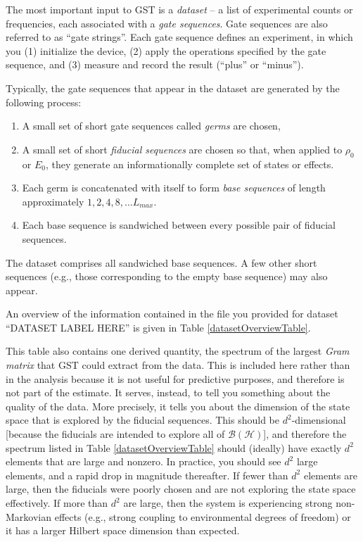 \documentclass{article}[11pt]
\newcommand{\putfield}[2]{#2}
\begin{document}
The most important input to GST is a \emph{dataset} -- a list of experimental counts or frequencies, each associated with a \emph{gate sequences}.  Gate sequences are also referred to as ``gate strings''.  Each gate sequence defines an experiment, in which you (1) initialize the device, (2) apply the operations specified by the gate sequence, and (3) measure and record the result (``plus'' or ``minus'').

Typically, the gate sequences that appear in the dataset are generated by the following process:
\begin{enumerate}
\item A small set of short gate sequences called \emph{germs} are chosen,
\item A small set of short \emph{fiducial sequences} are chosen so that, when applied to $\rho_0$ or $E_0$, they generate an informationally complete set of states or effects.
\item Each germ is concatenated with itself to form \emph{base sequences} of length approximately $1,2,4,8,\ldots L_{max}$.
\item Each base sequence is sandwiched between every possible pair of fiducial sequences.
\end{enumerate}
The dataset comprises all sandwiched base sequences.  A few other short sequences (e.g., those corresponding to the empty base sequence) may also appear.

\iftoggle{LsAndGermsSet}{ The fiducial sequences and germs for \emph{this} dataset are given in Table \ref{fiducialAndGermListTables}. }{ Fiducial sequence and germ information was not given for this report, and may not be applicable.}  An overview of the information contained in the file you provided for dataset ``\putfield{datasetLabel}{DATASET LABEL HERE}'' is given in Table \ref{datasetOverviewTable}.  

This table also contains one derived quantity, the spectrum of the largest \emph{Gram matrix} that GST could extract from the data.  This is included here rather than in the analysis because it is not useful for predictive purposes, and therefore is not part of the estimate.  It serves, instead, to tell you something about the quality of the data.  More precisely, it tells you about the dimension of the state space that is explored by the fiducial sequences.  This should be $d^2$-dimensional [because the fiducials are intended to explore all of $\mathcal{B}(\mathcal{H})$], and therefore the spectrum listed in Table \ref{datasetOverviewTable} should (ideally) have exactly $d^2$ elements that are large and nonzero.  In practice, you should see $d^2$ large elements, and a rapid drop in magnitude thereafter.  If fewer than $d^2$ elements are large, then the fiducials were poorly chosen and are not exploring the state space effectively.  If more than $d^2$ are large, then the system is experiencing strong non-Markovian effects (e.g., strong coupling to environmental degrees of freedom) or it has a larger Hilbert space dimension than expected.
\end{document}

